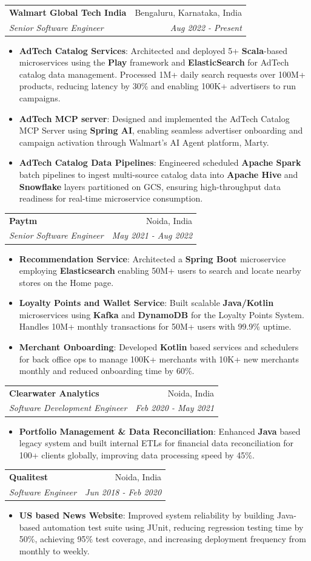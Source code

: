 \documentclass[letterpaper,11pt]{article}
\makeatletter
\newcommand{\resumeItem}[2]{
    \item\small{
        \textbf{#1}{: #2 \vspace{-2pt}}
    }
}
\newcommand{\resumeSubheading}[4]{
    \vspace{-1pt}\item
    \begin{tabular*}{0.97\textwidth}[t]{l@{\extracolsep{\fill}}r}
        \textbf{#1}       & #2                 \\
        \textit{\small#3} & \textit{\small #4} \\
    \end{tabular*}\vspace{-5pt}
}
\newcommand{\resumeItemListStart}{\begin{itemize}}
\newcommand{\resumeItemListEnd}{\end{itemize}\vspace{-5pt}}
\makeatother
\begin{document}
\resumeSubheading
{Walmart Global Tech India}{Bengaluru, Karnataka, India}
{Senior Software Engineer}{Aug 2022 - Present}
\resumeItemListStart
\resumeItem{AdTech Catalog Services}
{Architected and deployed 5+ \textbf{Scala}-based microservices using the \textbf{Play} framework and \textbf{ElasticSearch} for AdTech catalog data management. Processed 1M+ daily search requests over 100M+ products, reducing latency by 30\% and enabling 100K+ advertisers to run campaigns.}
\resumeItem{AdTech MCP server}
{Designed and implemented the AdTech Catalog MCP Server using \textbf{Spring AI}, enabling seamless advertiser onboarding and campaign activation through Walmart’s AI Agent platform, Marty.}
\resumeItem{AdTech Catalog Data Pipelines}
{Engineered scheduled \textbf{Apache Spark} batch pipelines to ingest multi-source catalog data into \textbf{Apache Hive} and \textbf{Snowflake} layers partitioned on GCS, ensuring high-throughput data readiness for real-time microservice consumption.}
\resumeItemListEnd
\resumeSubheading
{Paytm}{Noida, India}
{Senior Software Engineer}{May 2021 - Aug 2022}
\resumeItemListStart
\resumeItem{Recommendation Service}
{Architected a \textbf{Spring Boot} microservice employing \textbf{Elasticsearch} enabling 50M+ users to search and locate nearby stores on the Home page.}
\resumeItem{Loyalty Points and Wallet Service}
{Built scalable \textbf{Java/Kotlin} microservices using \textbf{Kafka} and \textbf{DynamoDB} for the Loyalty Points System. Handles 10M+ monthly transactions for 50M+ users with 99.9\% uptime.}
\resumeItem{Merchant Onboarding}
{Developed \textbf{Kotlin} based services and schedulers for back office ops to manage 100K+ merchants with 10K+ new merchants monthly and reduced onboarding time by 60\%.}
\resumeItemListEnd

\resumeSubheading
{Clearwater Analytics}{Noida, India}
{Software Development Engineer}{Feb 2020 - May 2021}
\resumeItemListStart
\resumeItem{Portfolio Management \& Data Reconciliation}
{Enhanced \textbf{Java} based legacy system and built internal ETLs for financial data reconciliation for 100+ clients globally, improving data processing speed by 45\%.}
\resumeItemListEnd

\resumeSubheading
{Qualitest}{Noida, India}
{Software Engineer}{Jun 2018 - Feb 2020}
\resumeItemListStart
\resumeItem{US based News Website}
{Improved system reliability by building Java-based automation test suite using JUnit, reducing regression testing time by 50\%, achieving 95\% test coverage, and increasing deployment frequency from monthly to weekly.}
\resumeItemListEnd
\end{document}
